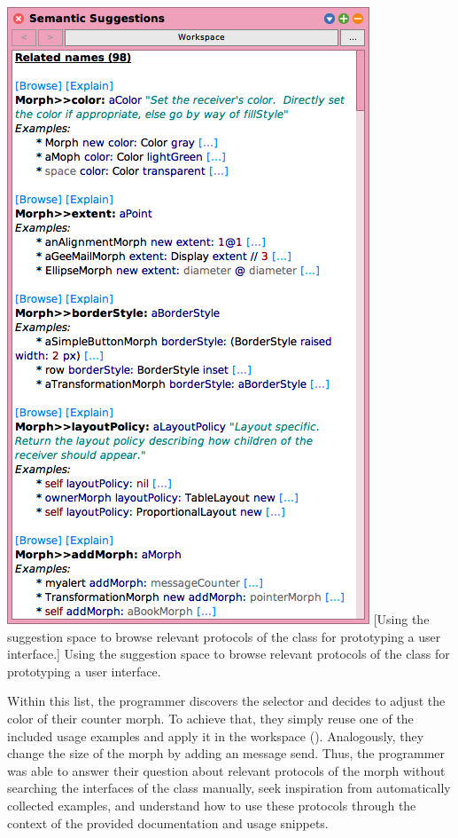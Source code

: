 \noindent
\begin{minipage}{\textwidth}
	\centering
	\includegraphics[height=28\baselineskip]{01_suggestions/suggestion_space.png} %
	[Using the suggestion space to browse relevant protocols of the class  for prototyping a user interface.]{
		Using the suggestion space to browse relevant protocols of the class  for prototyping a user interface.
	}
\end{minipage}

Within this list, the programmer discovers the  selector and decides to adjust the color of their counter morph.
To achieve that, they simply reuse one of the included usage examples and apply it in the workspace ().
Analogously, they change the size of the morph by adding an  message send.
Thus, the programmer was able to answer their question about relevant protocols of the morph without searching the interfaces of the  class manually, seek inspiration from automatically collected examples, and understand how to use these protocols through the context of the provided documentation and usage snippets.

